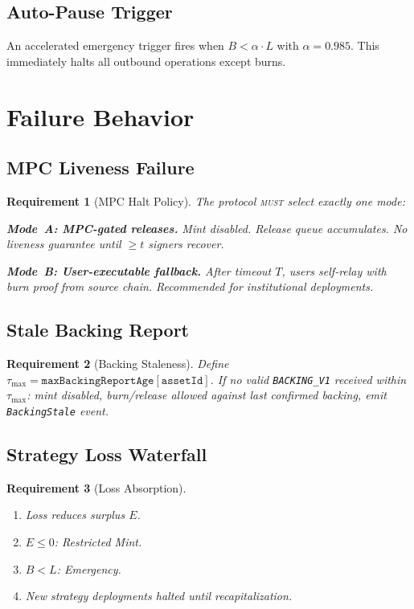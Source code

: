 \documentclass[11pt,twocolumn]{article}
\newtheorem{requirement}{Requirement}[section]
\theoremstyle{remark}
\begin{document}
\subsection{Auto-Pause Trigger}

An accelerated emergency trigger fires when $B < \alpha \cdot L$ with $\alpha = 0.985$. This immediately halts all outbound operations except burns.


\section{Failure Behavior}
\label{sec:failures}

\subsection{MPC Liveness Failure}
\label{sec:mpc-halt}

\begin{requirement}[MPC Halt Policy]
The protocol \textsc{must} select exactly one mode:

\noindent\textbf{Mode~A: MPC-gated releases.} Mint disabled. Release queue accumulates. No liveness guarantee until $\geq t$ signers recover.

\noindent\textbf{Mode~B: User-executable fallback.} After timeout $T$, users self-relay with burn proof from source chain. Recommended for institutional deployments.
\end{requirement}

\subsection{Stale Backing Report}
\label{sec:stale}

\begin{requirement}[Backing Staleness]
Define $\tau_{\max} = \texttt{maxBackingReportAge}[\texttt{assetId}]$. If no valid \texttt{BACKING\_V1} received within $\tau_{\max}$: mint disabled, burn/release allowed against last confirmed backing, emit \texttt{BackingStale} event.
\end{requirement}

\subsection{Strategy Loss Waterfall}

\begin{requirement}[Loss Absorption]
\begin{enumerate}[nosep]
  \item Loss reduces surplus $E$.
  \item $E \leq 0$: Restricted Mint.
  \item $B < L$: Emergency.
  \item New strategy deployments halted until recapitalization.
\end{enumerate}
\end{requirement}
\end{document}

